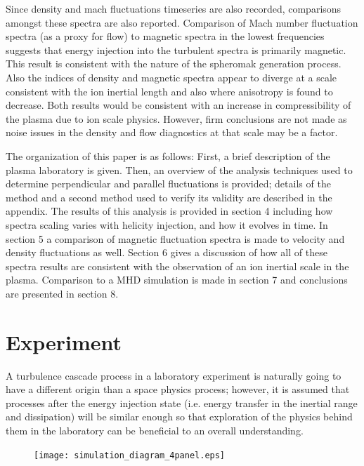 \documentclass[aip,prl,amsmath,amssymb,reprint,superscriptaddress]{revtex4-1} %
\begin{document}
Since density and mach fluctuations timeseries are also recorded, comparisons amongst these spectra are also reported. Comparison of Mach number fluctuation spectra (as a proxy for flow) to magnetic spectra in the lowest frequencies suggests that energy injection into the turbulent spectra is primarily magnetic. This result is consistent with the nature of the spheromak generation process. Also the indices of density and magnetic spectra appear to diverge at a scale consistent with the ion inertial length and also where anisotropy is found to decrease. Both results would be consistent with an increase in compressibility of the plasma due to ion scale physics. However, firm conclusions are not made as noise issues in the density and flow diagnostics at that scale may be a factor.

The organization of this paper is as follows: First, a brief description of the plasma laboratory is given. Then, an overview of the analysis techniques used to determine perpendicular and parallel fluctuations is provided; details of the method and a second method used to verify its validity are described in the appendix. The results of this analysis is provided in section 4 including how spectra scaling varies with helicity injection, and how it evolves in time. In section 5 a comparison of magnetic fluctuation spectra is made to velocity and density fluctuations as well. Section 6 gives a discussion of how all of these spectra results are consistent with the observation of an ion inertial scale in the plasma. Comparison to a MHD simulation is made in section 7 and conclusions are presented in section 8.

\section{Experiment}

A turbulence cascade process in a laboratory experiment is naturally going to have a different origin than a space physics process; however, it is assumed that processes after the energy injection state (i.e. energy transfer in the inertial range and dissipation) will be similar enough so that exploration of the physics behind them in the laboratory can be beneficial to an overall understanding.

\begin{figure}[!htbp]
\centerline{
\texttt{[image: simulation\_diagram\_4panel.eps]}}
\caption{\label{fig:moviestills}}
\end{figure}
\end{document}
